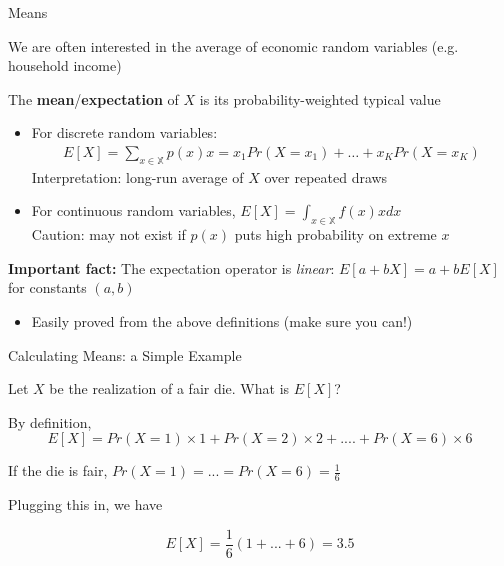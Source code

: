 \documentclass[11pt,english,handout]{beamer}
\newenvironment{wideitemize}{\itemize\addtolength{\itemsep}{10pt}}{\enditemize}
\begin{document}
\begin{frame}{Means}

\begin{wideitemize}

\item
We are often interested in the average of economic random variables (e.g. household income)

\item\pause{}
The \textbf{mean}/\textbf{expectation} of $X$ is its probability-weighted typical value


\begin{itemize}
\item For discrete random variables:
\vspace{-0.1cm}
\begin{align*}
E[X]=\sum_{x\in\mathbb{X}}p(x)x=x_1Pr(X=x_1)+\dots + x_KPr(X=x_K)
\end{align*}\pause{}
\vspace{-0.2cm}
Interpretation: long-run average of $X$ over repeated draws\pause{}

\vspace{0.5cm}
\item For continuous random variables, $E[X]=\int_{x\in\mathbb{X}}f(x)xdx$\pause \\ Caution: may not exist if $p(x)$ puts high probability on extreme $x$
\end{itemize}
\vspace{0.1cm}\pause

\item \textbf{Important fact:} The expectation operator is \emph{linear}: $E[a+bX]=a+bE[X]$ for  constants $(a,b)$
\vspace{0.1cm}

\begin{itemize}
\item Easily proved from the above definitions (make sure you can!)
\end{itemize}
\end{wideitemize}

\end{frame}



\begin{frame}{Calculating Means: a Simple Example}
	\begin{wideitemize}
		
		\item
		Let $X$ be the realization of a fair die. What is $E[X]$? 
		
		\smallskip
		\pause
		\item
		By definition,
		$$E[X] = Pr(X=1) \times 1 + Pr(X=2) \times 2 + .... + Pr(X=6) \times 6$$
		
		\pause
		\item
\smallskip
		If the die is fair, $Pr(X=1) =...=Pr(X=6) = \frac{1}{6}$
		
		\pause 
		\item 
		Plugging this in, we have
		
		$$E[X] = \frac{1}{6} (1+...+6) = 3.5$$
		
	\end{wideitemize}	
\end{frame}
\end{document}
